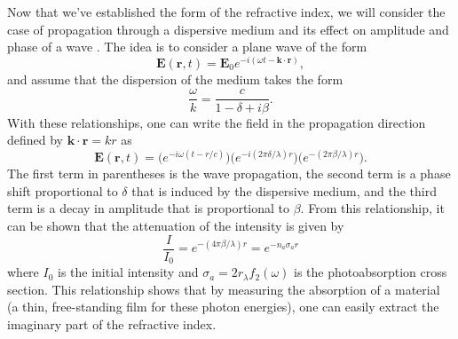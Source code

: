Now that we've established the form of the refractive index, we will consider the case of propagation through a dispersive medium and its effect on amplitude and phase of a wave \cite{attwoodSoftXraysExtreme2000}. The idea is to consider a plane wave of the form
\begin{equation}
	\mathbf{E}(\mathbf{r},t)=\mathbf{E}_0e^{-i(\omega t - \mathbf{k}\cdot\mathbf{r})},
\end{equation}
and assume that the dispersion of the medium takes the form
\begin{equation}
	\frac{\omega}{k}=\frac{c}{1-\delta+i\beta}.
\end{equation}
With these relationships, one can write the field in the propagation direction defined by $\mathbf{k}\cdot\mathbf{r}=kr$ as
\begin{equation}
\label{eqn:wave_prop}
	\mathbf{E}(\mathbf{r},t)=\big(e^{-i\omega(t - r/c)}\big) \big(e^{-i(2\pi\delta/\lambda)r}\big) \big(e^{-(2\pi\beta/\lambda)r}\big).
\end{equation}
The first term in parentheses is the wave propagation, the second term is a phase shift proportional to $\delta$ that is induced by the dispersive medium, and the third term is a decay in amplitude that is proportional to $\beta$.  From this relationship, it can be shown that the attenuation of the intensity is given by 
\begin{equation}
\label{eqn:beer-lambert}
	\frac{I}{I_0}=e^{-(4\pi\beta/\lambda)r}=e^{-n_a \sigma_a r}
\end{equation}
where $I_0$ is the initial intensity and $\sigma_a=2r_\lambda f_2(\omega)$ is the photoabsorption cross section.  This relationship shows that by measuring the absorption of a material (a thin, free-standing film for these photon energies), one can easily extract the imaginary part of the refractive index.

